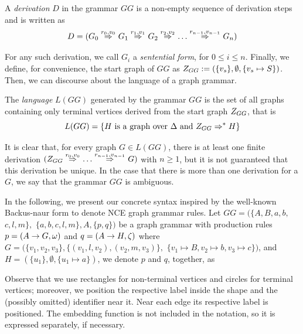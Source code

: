\begin{definition}
	A \emph{derivation} $D$ in the grammar $GG$ is a non-empty sequence of derivation steps and is written as
	\begin{equation*}
		D = (G_0 \deriv{r_0}{v_0}{} G_1 \deriv{r_1}{v_1}{} G_2 \deriv{r_2}{v_2}{} \dots \deriv{r_{n-1}}{v_{n-1}}{} G_n)
	\end{equation*}
\end{definition}

For any such derivation, we call $G_i$ a \emph{sentential form}, for $0 \le i \le n$. Finally, we define, for convenience, the start graph of $GG$ as $Z_{GG} := (\{v_s\},\emptyset,\{v_s \mapsto S\})$. Then, we can discourse about the language of a graph grammar.

\begin{definition}
	The \emph{language} $L(GG)$ generated by the grammar $GG$ is the set of all graphs containing only terminal vertices derived from the start graph $Z_{GG}$, that is
	\begin{equation*}
		L(GG) = \{H \text{ is a graph over } \Delta \text{ and } Z_{GG} \Rightarrow^*_{} H\}
	\end{equation*}
\end{definition}

It is clear that, for every graph $G \in L(GG)$, there is at least one finite derivation $(\startG{GG} \deriv{r_0}{v_0}{} \dots \deriv{r_{n-1}}{v_{n-1}}{} G)$ with $n \ge 1$, but it is not guaranteed that this derivation be unique. In the case that there is more than one derivation for a $G$, we say that the grammar $GG$ is ambiguous.

In the following, we present our concrete syntax inspired by the well-known Backus-naur form to denote NCE graph grammar rules. Let $GG = (\{A, B, a, b,$ $ c, l, m\},$ $\{a, b, c, l, m\}, A, \{p,q\})$ be a graph grammar with production rules $p = (A \to G,\omega)$ and $q = (A \to H,\zeta)$ where $G = (\{v_1, v_2, v_3\}, \{(v_1,l,v_2), (v_2,m,v_3)\},$ $\{v_1 \mapsto B, v_2 \mapsto b, v_3 \mapsto c \})$, and $H = (\{u_1\}, \emptyset, \{u_1 \mapsto a\})$, we denote $p$ and $q$, together, as
%


Observe that we use rectangles for non-terminal vertices and circles for terminal vertices; moreover, we position the respective label inside the shape and the (possibly omitted) identifier near it. Near each edge its respective label is positioned. The embedding function is not included in the notation, so it is expressed separately, if necessary.

